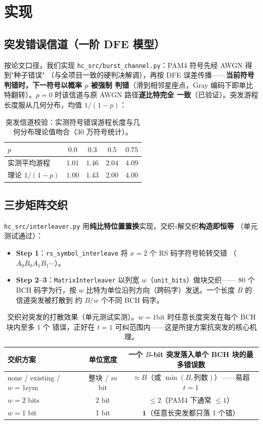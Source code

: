 \documentclass[11pt,a4paper]{article}
\begin{document}
\section{实现}

\subsection{突发错误信道（一阶 DFE 模型）}

按论文口径，我们实现 \texttt{hc\_src/burst\_channel.py}：PAM4 符号先经 AWGN 得到"种子错误"
（与全项目一致的硬判决解调），再按 DFE 误差传播——\textbf{当前符号判错时，下一符号以概率 $p$ 被强制
判错}（滑到相邻星座点，Gray 编码下即单比特翻转）。$p{=}0$ 时该信道与原 AWGN 路径\textbf{逐比特完全
一致}（已验证）。突发游程长度服从几何分布，均值 $1/(1-p)$：

\begin{table}[!ht]
\centering
\begin{tabular}{lcccc}
\toprule
$p$ & $0.0$ & $0.3$ & $0.5$ & $0.75$ \\
\midrule
实测平均游程 & $1.01$ & $1.46$ & $2.04$ & $4.09$ \\
理论 $1/(1-p)$ & $1.00$ & $1.43$ & $2.00$ & $4.00$ \\
\bottomrule
\end{tabular}
\caption{突发信道校验：实测符号错误游程长度与几何分布理论值吻合（30 万符号统计）。}
\end{table}

\subsection{三步矩阵交织}

\texttt{hc\_src/interleaver.py} 用\textbf{纯比特位置置换}实现，交织$\circ$解交织\textbf{构造即恒等}
（单元测试通过）：
\begin{itemize}[leftmargin=1.5em, itemsep=1pt]
\item \textbf{Step 1}：\texttt{rs\_symbol\_interleave} 将 $x{=}2$ 个 RS 码字符号轮转交错
      （$A_0 B_0 A_1 B_1\cdots$）。
\item \textbf{Step 2--3}：\texttt{MatrixInterleaver} 以列宽 $w$（\texttt{unit\_bits}）做块交织——
      $80$ 个 BCH 码字为行，按 $w$ 比特为单位沿列方向（跨码字）发送。一个长度 $B$ 的信道突发被打散到
      约 $B/w$ 个不同 BCH 码字。
\end{itemize}

\begin{table}[!ht]
\centering
\begin{tabular}{lcc}
\toprule
交织方案 & 单位宽度 & 一个 $B$-bit 突发落入单个 BCH 块的最多错误数 \\
\midrule
none / existing / $w{=}1$sym & 整块 / $m$ bit & $\approx B$（或 $\min(B,\text{列数})$）——易超 $t{=}1$ \\
$w=2$ bits & 2 bit & $\le 2$（PAM4 下通常 $\le 1$）\\
$w=1$ bit  & 1 bit & $\textbf{1}$（任意长突发都只落 1 个错）\\
\bottomrule
\end{tabular}
\caption{交织对突发的打散效果（单元测试实测）。$w{=}1$bit 时任意长度突发在每个 BCH 块内至多 1 个
错误，正好在 $t{=}1$ 可纠范围内——这是所提方案抗突发的核心机理。}
\end{table}
\end{document}
